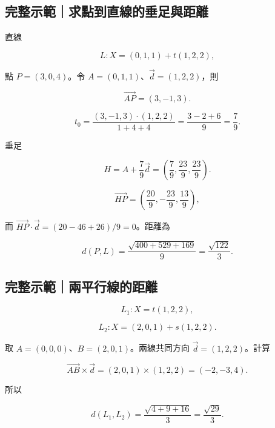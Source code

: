 \documentclass[11pt,a4paper]{article}
\begin{document}
\begin{HandoutWorkedExample}

\subsection{完整示範｜求點到直線的垂足與距離}\label{ux5b8cux6574ux793aux7bc4ux6c42ux9edeux5230ux76f4ux7ddaux7684ux5782ux8db3ux8207ux8dddux96e2}

直線

\[
L:X=(0,1,1)+t(1,2,2),
\]

點 \(P=(3,0,4)\)。令 \(A=(0,1,1)\)、\(\vec d=(1,2,2)\)，則

\[
\overrightarrow{AP}=(3,-1,3).
\]

\[
t_0=\frac{(3,-1,3)\cdot(1,2,2)}{1+4+4}
=\frac{3-2+6}{9}
=\frac79.
\]

垂足

\[
H=A+\frac79\vec d
=\boxed{\left(\frac79,\frac{23}{9},\frac{23}{9}\right)}.
\]

\[
\overrightarrow{HP}
=\left(\frac{20}{9},-\frac{23}{9},\frac{13}{9}\right),
\]

而 \(\overrightarrow{HP}\cdot\vec d=(20-46+26)/9=0\)。距離為

\[
d(P,L)
=\frac{\sqrt{400+529+169}}9
=\boxed{\frac{\sqrt{122}}3}.
\]

\end{HandoutWorkedExample}

\begin{HandoutWorkedExample}

\subsection{完整示範｜兩平行線的距離}\label{ux5b8cux6574ux793aux7bc4ux5169ux5e73ux884cux7ddaux7684ux8dddux96e2}

\[
L_1:X=t(1,2,2),
\]

\[
L_2:X=(2,0,1)+s(1,2,2).
\]

取 \(A=(0,0,0)\)、\(B=(2,0,1)\)。兩線共同方向 \(\vec d=(1,2,2)\)。計算

\[
\overrightarrow{AB}\times\vec d
=(2,0,1)\times(1,2,2)
=(-2,-3,4).
\]

所以

\[
d(L_1,L_2)
=\frac{\sqrt{4+9+16}}{3}
=\boxed{\frac{\sqrt{29}}3}.
\]

\end{HandoutWorkedExample}
\end{document}
